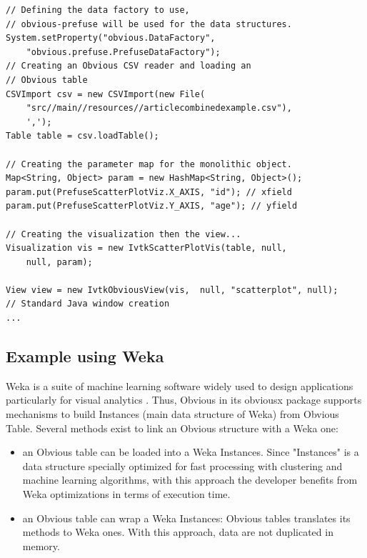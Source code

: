 \begin{lstlisting}
// Defining the data factory to use,
// obvious-prefuse will be used for the data structures.
System.setProperty("obvious.DataFactory",
    "obvious.prefuse.PrefuseDataFactory");
// Creating an Obvious CSV reader and loading an
// Obvious table
CSVImport csv = new CSVImport(new File(
    "src//main//resources//articlecombinedexample.csv"),
    ',');
Table table = csv.loadTable();

// Creating the parameter map for the monolithic object.
Map<String, Object> param = new HashMap<String, Object>();
param.put(PrefuseScatterPlotViz.X_AXIS, "id"); // xfield
param.put(PrefuseScatterPlotViz.Y_AXIS, "age"); // yfield

// Creating the visualization then the view...
Visualization vis = new IvtkScatterPlotVis(table, null,
    null, param);

View view = new IvtkObviousView(vis,  null, "scatterplot", null);
// Standard Java window creation
...
\end{lstlisting}

\subsection{Example using Weka}

Weka \cite{Weka} is a suite of machine learning software widely used to design applications particularly for visual analytics . Thus, Obvious in its obviousx package supports mechanisms to build Instances (main data structure of Weka) from Obvious Table. Several methods exist to link an Obvious structure with a Weka one:

\begin{itemize}
\item an Obvious table can be loaded into a Weka Instances. Since "Instances" is a data structure specially optimized for fast processing with clustering and machine learning algorithms, with this approach the developer benefits from Weka optimizations in terms of execution time.
\item an Obvious table can wrap a Weka Instances: Obvious tables translates its methods to Weka ones. With this approach, data are not duplicated in memory.
\end{itemize}

